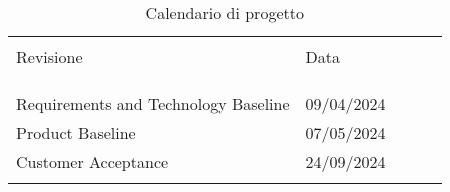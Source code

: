 \begin{table}[!h]
    \begin{center}
        \begin{tabular}{ l l l l p{9cm} }
            \hline                                                                                                          \\[-2ex]
            Revisione & Data\\
            \\[-2ex] \hline \\[-1.5ex]                                                                                      \\
            Requirements and Technology Baseline & 09/04/2024 \\
            Product Baseline & 07/05/2024 \\
            Customer Acceptance & 24/09/2024 \\
            \\[-1.5ex] \hline
        \end{tabular}
    \end{center}
    \caption{Calendario di progetto}
    \label{tab:2}
\end{table}

